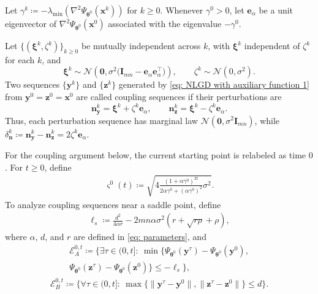 \documentclass{siamart251216}
\begin{document}
Let $\gamma^{k}\coloneqq-\lambda_{\min}(\nabla^{2}\Psi_{\boldsymbol{\theta}^{0}}(\mathbf{x}^{k}))$ for $k\geq0$. Whenever $\gamma^{0}>0$, let $\mathbf{e}_{\alpha}$ be a unit eigenvector of $\nabla^{2}\Psi_{\boldsymbol{\theta}^{0}}(\mathbf{x}^{0})$ associated with the eigenvalue $-\gamma^{0}$.

\begin{definition}
    \label{def: Coupling sequence}
    Let $\{(\boldsymbol{\xi}^{k},\zeta^{k})\}_{k\geq0}$ be mutually independent across $k$, with $\boldsymbol{\xi}^{k}$ independent of $\zeta^{k}$ for each $k$, and
    \[
        \boldsymbol{\xi}^{k}\sim\mathcal{N}\!\left(\bm{0},\sigma^{2}\big(\mathbf{I}_{mn}-\mathbf{e}_{\alpha}\mathbf{e}_{\alpha}^{\top}\big)\right),
        \qquad
        \zeta^{k}\sim\mathcal{N}(0,\sigma^{2}).
    \]
    Two sequences $\{\mathbf{y}^{k}\}$ and $\{\mathbf{z}^{k}\}$ generated by \eqref{eq: NLGD with auxiliary function 1} from $\mathbf{y}^{0}=\mathbf{z}^{0}=\mathbf{x}^{0}$ are called coupling sequences if their perturbations are
    \[
        \mathbf{n}_{\mathbf{y}}^{k}=\boldsymbol{\xi}^{k}+\zeta^{k}\mathbf{e}_{\alpha},
        \qquad
        \mathbf{n}_{\mathbf{z}}^{k}=\boldsymbol{\xi}^{k}-\zeta^{k}\mathbf{e}_{\alpha}.
    \]
    Thus, each perturbation sequence has marginal law $\mathcal{N}(\bm{0},\sigma^{2}\mathbf{I}_{mn})$, while $\delta_{\mathbf{n}}^{k}\coloneqq\mathbf{n}_{\mathbf{y}}^{k}-\mathbf{n}_{\mathbf{z}}^{k}=2\zeta^{k}\mathbf{e}_{\alpha}$.
\end{definition}

For the coupling argument below, the current starting point is relabeled as time $0$. For $t\geq0$, define
\begin{gather}
    \label{eq: varsigma}
    \varsigma^{0}(t)\coloneqq\sqrt{4\frac{(1+\alpha\gamma^{0})^{2t}}{2\alpha\gamma^{0}+(\alpha\gamma^{0})^{2}}\sigma^{2}}.
\end{gather}
To analyze coupling sequences near a saddle point, define
\begin{gather}
    \label{eq: ls}
    \ell_{s}\coloneqq\frac{d^{2}}{4\alpha r}-2mn\alpha\sigma^{2}(r+\sqrt{r\rho}+\rho),
\end{gather}
where $\alpha$, $d$, and $r$ are defined in \eqref{eq: parameters}, and
\begin{multline}
    \label{eq: Event A}
    \mathcal{E}_{A}^{0,t}\coloneqq\Big\{\exists\tau\in(0,t]:~\min\big\{\Psi_{\boldsymbol{\theta}^{0}}(\mathbf{y}^{\tau})-\Psi_{\boldsymbol{\theta}^{0}}(\mathbf{y}^{0}),\\
    \Psi_{\boldsymbol{\theta}^{0}}(\mathbf{z}^{\tau})-\Psi_{\boldsymbol{\theta}^{0}}(\mathbf{z}^{0})\big\}\leq-\ell_{s}\Big\},
\end{multline}
\begin{gather}
    \label{eq: Event B}
    \mathcal{E}_{B}^{0,t}\coloneqq\Big\{\forall\tau\in(0,t]:~\max\big\{\|\mathbf{y}^{\tau}-\mathbf{y}^{0}\|,\|\mathbf{z}^{\tau}-\mathbf{z}^{0}\|\big\}\leq d\Big\}.
\end{gather}
\end{document}

